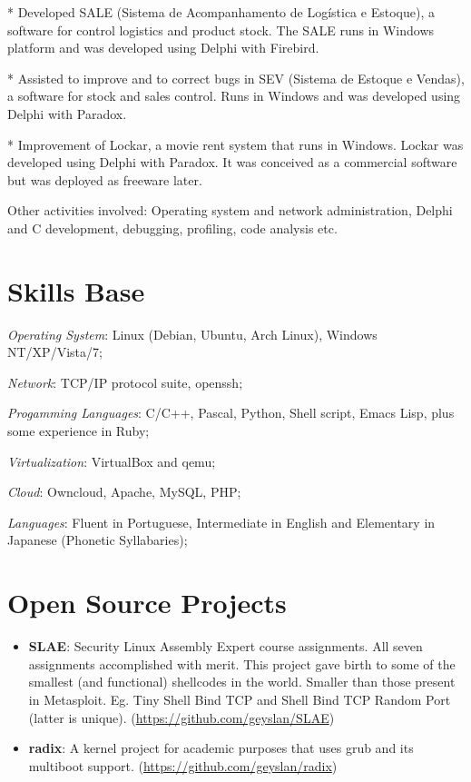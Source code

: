 \documentclass[margin]{res}
\begin{document}
\begin{resume}
* Developed SALE (Sistema de Acompanhamento de Logística e Estoque), a
software for control logistics and product stock. The SALE runs in
Windows platform and was developed using Delphi with Firebird.

* Assisted to improve and to correct bugs in SEV (Sistema de Estoque e
Vendas), a software for stock and sales control. Runs in Windows and
was developed using Delphi with Paradox.

* Improvement of Lockar, a movie rent system that runs in Windows. Lockar was
developed using Delphi with Paradox. It was conceived as a commercial software
but was deployed as freeware later.

Other activities involved: Operating system and network administration, Delphi
and C development, debugging, profiling, code analysis etc.

\section{Skills Base} \textit{Operating System}: Linux (Debian, Ubuntu, Arch
Linux), Windows NT/XP/Vista/7;

\textit{Network}: TCP/IP protocol suite, openssh;

\textit{Progamming Languages}: C/C++, Pascal, Python, Shell script, Emacs Lisp,
plus some experience in Ruby;

\textit{Virtualization}: VirtualBox and qemu;

\textit{Cloud}: Owncloud, Apache, MySQL, PHP;

\textit{Languages}: Fluent in Portuguese, Intermediate in English and
Elementary in Japanese (Phonetic Syllabaries);

\section{Open Source Projects}
\begin{itemize}
\item \textbf{SLAE}: Security Linux Assembly Expert course assignments. All
  seven assignments accomplished with merit. This project gave birth to some of
  the smallest (and functional) shellcodes in the world. Smaller than those
  present in Metasploit. Eg. Tiny Shell Bind TCP and Shell Bind TCP Random Port
  (latter is unique).\newline
  (\url{https://github.com/geyslan/SLAE})\vspace{1mm}

\item \textbf{radix}: A kernel project for academic purposes that uses grub and
  its multiboot support.\newline
  (\url{https://github.com/geyslan/radix})\vspace{1mm}


\end{itemize}
\end{resume}
\end{document}
